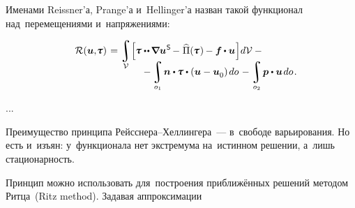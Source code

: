 \begin{otherlanguage}{russian}

\noindent
Именами Reissner’а, Prange’а и~Hellinger’а назван такой функционал над~перемещениями и~напряжениями:

\nopagebreak\vspace{-0.25em}\begin{multline}\label{reissnerhellingervariationalprinciple}
\shoveleft{\displaystyle \mathcal{R}(\bm{u}, \hspace{-0.32ex}\mathboldtau) \hspace{0.2ex} =
\integral\displaylimits_{\mathcal{V}} \hspace{-0.4ex}
\left[^{\mathstrut} \hspace{-0.2ex}
\mathboldtau \dotdotp \hspace{-0.16ex} \boldnabla {\bm{u}}^{\hspace{0.08ex}\mathsf{S}} \hspace{-0.2ex} - \hspace{0.1ex} \widehat{\Pi}(\hspace{-0.1ex}\mathboldtau\hspace{.1ex})\hspace{-0.1ex} -
\bm{f} \hspace{-0.1ex} \dotp \bm{u}
\hspace{0.1ex} \right] \hspace{-0.32ex} d\mathcal{V} \hspace{.5ex} - \hfill} \\[-1.2em]
%
\hspace{8em} \displaystyle - \integral\displaylimits_{o_1} \hspace{-0.25ex} \bm{n} \dotp \hspace{-0.1ex} \mathboldtau \dotp \left( \bm{u} - \bm{u}_{\raisemath{-0.1em}{0}} \right) \hspace{-0.1ex} do \hspace{.2ex} -
\integral\displaylimits_{o_2} \hspace{-0.2ex} \bm{p} \dotp \bm{u} \hspace{0.25ex} do \hspace{0.2ex}.
\end{multline}


...


Преимущество принципа Рейсснера\hbox{--}Хеллингера~--- в~свободе варьирования. Но есть и~изъян: у~функционала нет экстремума на~истинном решении, а~лишь стационарность.

Принцип можно использовать для~построения приближённых решений методом Ритца~(Ritz method). Задавая аппроксимации



\end{otherlanguage}
